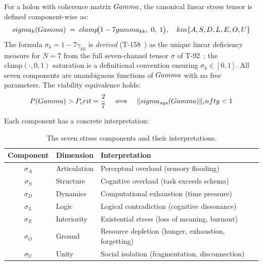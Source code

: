 \begin{theorembox}
For a holon with coherence matrix $Gamma$, the canonical linear stress tensor is defined
component-wise as:
\begin{equation}
  sigma_k(Gamma) \;=\; clamp\!\bigl(1 - 7gamma_{kk},\; 0,\; 1\bigr),
  \quad k in \{A,S,D,L,E,O,U\}
  \label{eq:stress-tensor}
\end{equation}
The formula $\sigma_k = 1 - 7\gamma_{kk}$ is \emph{derived} (T-158~) as the
unique linear deficiency measure for $N=7$ from the full seven-channel tensor $\sigma$
of T-92~; the $\mathrm{clamp}(\cdot,0,1)$ saturation is a definitional
convention ensuring $\sigma_k \in [0,1]$. All seven components are unambiguous
functions of $Gamma$ with no free parameters. The viability equivalence holds:
\begin{equation}
  P(Gamma) > P_crit = \frac{2}{7}
  \quad\Longleftrightarrow\quad
  \|sigma_{sys}(Gamma)\|_infty < 1
  \label{eq:stress-viability}
\end{equation}
\end{theorembox}

Each component has a concrete interpretation:

\begin{table}[H]
\centering
\caption{The seven stress components and their interpretations.}
\label{tab:stress-components}
\small
\begin{tabular}{@{}cll@{}}
\toprule
\textbf{Component} & \textbf{Dimension} & \textbf{Interpretation} \\
\midrule
$\sigma_A$ & Articulation & Perceptual overload (sensory flooding) \\
$\sigma_S$ & Structure    & Cognitive overload (task exceeds schema) \\
$\sigma_D$ & Dynamics     & Computational exhaustion (time pressure) \\
$\sigma_L$ & Logic        & Logical contradiction (cognitive dissonance) \\
$\sigma_E$ & Interiority  & Existential stress (loss of meaning, burnout) \\
$\sigma_O$ & Ground       & Resource depletion (hunger, exhaustion, forgetting) \\
$\sigma_U$ & Unity        & Social isolation (fragmentation, disconnection) \\
\bottomrule
\end{tabular}
\end{table}


